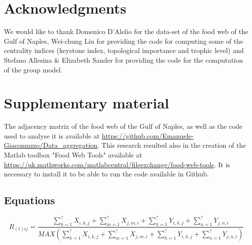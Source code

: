 \documentclass[twocolumn]{article}
\begin{document}
\section*{Acknowledgments}
    We would like to thank Domenico D'Alelio %
    for the data-set of the food web of the Gulf of Naples, Wei-chung Liu for providing the code for computing some of the centrality indices (keystone index, topological importance and trophic level) and Stefano Allesina \& Elizabeth Sander for providing the code for the  computation of the group model. 
\section*{Supplementary material}
    The adjacency matrix of the food web of the Gulf of Naples, as well as the code used to analyse it is available at \url{https://github.com/Emanuele-Giacomuzzo/Data_aggregation}. This research resulted also in the creation of the Matlab toolbox "Food Web Tools" available at  \url{https://uk.mathworks.com/matlabcentral/fileexchange/food-web-tools}. It is necessary to install it to be able to run the code available in Github.


\begin{appendices}
    \section*{Equations}
        \begin{equation}
            R_{(t)ij}=\frac{\sum\limits_{k=1}^?{X_{i,k,j}}+\sum\limits_{m=1}^?{X_{j,m,i}}+\sum\limits_{h=1}^?{Y_{i,h,j}}+\sum\limits_{n=1}^?{Y_{j,n,i}}}{MAX(\sum\limits_{k=1}^?{X_{i,k,j}}+\sum\limits_{m=1}^?{X_{j,m,i}}+\sum\limits_{h=1}^?{Y_{i,h,j}}+\sum\limits_{n=1}^?{Y_{j,n,i}})}
                \label{eqn:REGEupdate}
        \end{equation}
\end{appendices}
\end{document}
